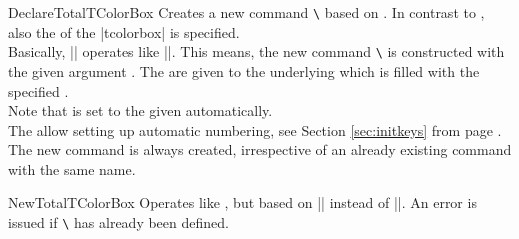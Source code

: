 \begin{docCommand}{DeclareTotalTColorBox}{}
  Creates a new command \texttt{\textbackslash} based on .
  In contrast to , also the  of the |tcolorbox| is specified.\\
  Basically, |\DeclareTotalTColorBox| operates like |\DeclareDocumentCommand|. This means,
  the new command \texttt{\textbackslash} is constructed with the given argument .
  The  are given to the underlying  which is filled with
  the specified .\\
  Note that  is set to the given 
  automatically.\\
  The  allow setting up automatic numbering,
  see Section \ref{sec:initkeys} from page \pageref{sec:initkeys}.\\
  The new command is always created, irrespective of an already existing
  command with the same name.

\end{docCommand}

\begin{docCommand}{NewTotalTColorBox}{}
  Operates like , but based on |\NewDocumentCommand| instead of |\DeclareDocumentCommand|.
  An error is issued if \texttt{\textbackslash} has already been defined.
\end{docCommand}

